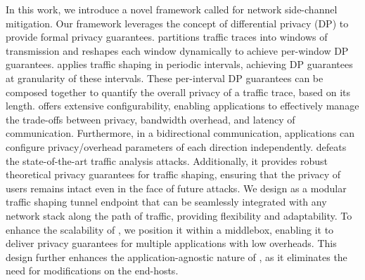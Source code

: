In this work, we introduce a novel framework called {\sys} for network side-channel mitigation.
Our framework leverages the concept of differential privacy (DP) to provide formal privacy guarantees.
{\sys} partitions traffic traces into windows of transmission and reshapes each window dynamically to achieve per-window DP guarantees.
{\sys} applies traffic shaping in periodic intervals, achieving DP guarantees at granularity of these intervals. 
These per-interval DP guarantees can be composed together to quantify the overall privacy of a traffic trace, based on its length.
{\sys} offers extensive configurability, enabling applications to effectively manage the trade-offs between privacy, bandwidth overhead, and latency of communication.
Furthermore, in a bidirectional communication, applications can configure privacy/overhead parameters of each direction independently.
{\sys} defeats the state-of-the-art traffic analysis attacks.
Additionally, it provides robust theoretical privacy guarantees for traffic shaping, ensuring that the privacy of users remains intact even in the face of future attacks.
We design {\sys} as a modular traffic shaping tunnel endpoint that can be seamlessly integrated with any network stack along the path of traffic, providing flexibility and adaptability.
To enhance the scalability of {\sys}, we position it within a middlebox, enabling it to deliver privacy guarantees for multiple applications with low overheads. 
This design further enhances the application-agnostic nature of {\sys}, as it eliminates the need for modifications on the end-hosts. 






